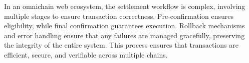 In an omnichain web ecosystem, the settlement workflow is complex, involving multiple stages to ensure transaction correctness. Pre-confirmation ensures eligibility, while final confirmation guarantees execution. Rollback mechanisms and error handling ensure that any failures are managed gracefully, preserving the integrity of the entire system. This process ensures that transactions are efficient, secure, and verifiable across multiple chains.

